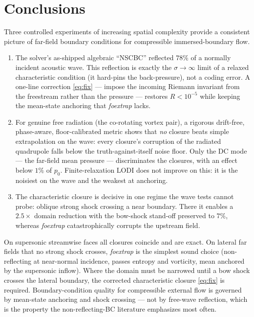 \documentclass{jfm}
\begin{document}
\section{Conclusions}\label{sec:concl}

Three controlled experiments of increasing spatial complexity provide a consistent picture of
far-field boundary conditions for compressible immersed-boundary flow.

\begin{enumerate}

\item The solver's as-shipped algebraic ``NSCBC'' reflected $78\%$ of a normally incident
acoustic wave. This reflection is exactly the $\sigma\to\infty$ limit of a relaxed characteristic
condition (it hard-pins the back-pressure), not a coding error. A one-line correction
\eqref{eq:fix} --- impose the incoming Riemann invariant from the freestream rather than the
pressure --- restores $R<10^{-5}$ while keeping the mean-state anchoring that \textit{foextrap}
lacks.

\item For genuine free radiation (the co-rotating vortex pair), a rigorous drift-free, phase-aware,
floor-calibrated metric shows that \emph{no} closure beats simple extrapolation on the wave:
every closure's corruption of the radiated quadrupole falls below the truth-against-itself noise
floor. Only the DC mode --- the far-field mean pressure --- discriminates the closures, with an
effect below $1\%$ of $p_0$. Finite-relaxation LODI does not improve on this: it is the noisiest
on the wave and the weakest at anchoring.

\item The characteristic closure is decisive in one regime the wave tests cannot probe: oblique
strong shock crossing a near boundary. There it enables a $2.5\times$ domain reduction with the
bow-shock stand-off preserved to $7\%$, whereas \textit{foextrap} catastrophically corrupts the
upstream field.

\end{enumerate}

On supersonic streamwise faces all closures coincide and are exact. On lateral far fields that
no strong shock crosses, \textit{foextrap} is the simplest sound choice (non-reflecting at
near-normal incidence, passes entropy and vorticity, mean anchored by the supersonic inflow).
Where the domain must be narrowed until a bow shock crosses the lateral boundary, the corrected
characteristic closure \eqref{eq:fix} is required. Boundary-condition quality for compressible
external flow is governed by mean-state anchoring and shock crossing --- not by free-wave
reflection, which is the property the non-reflecting-BC literature emphasizes most often.
\end{document}
